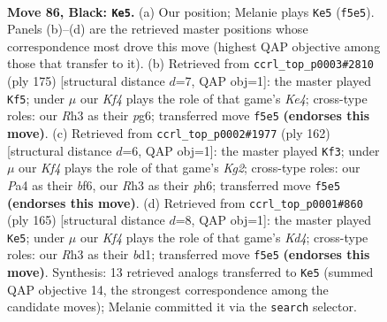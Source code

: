 \documentclass[11pt]{article}
\begin{document}
\clearpage

\begin{figure}[p]\centering
\begin{subfigure}{0.46\textwidth}\centering
\resizebox{\linewidth}{!}{%
\newchessgame
\chessboard[
  setfen={8/8/8/2p2k2/p2p4/7r/4K3/8 b - - 13 86},
  showmover=false,
  pgfstyle=straightmove, color=movearrow, markmove={f5-e5}
]}
\caption{}
\end{subfigure}\hfill
\begin{subfigure}{0.46\textwidth}\centering
\resizebox{\linewidth}{!}{%
\newchessgame
\chessboard[
  setfen={8/6p1/6Pp/4k3/1P5K/8/8/8 b - - 8 88},
  showmover=false,
  pgfstyle=straightmove, color=movearrow, markmove={e5-f5}
]}
\caption{}
\end{subfigure}
\\[4pt]
\begin{subfigure}{0.46\textwidth}\centering
\resizebox{\linewidth}{!}{%
\newchessgame
\chessboard[
  setfen={5k2/8/5b1p/5P2/6P1/8/6K1/8 w - - 4 82},
  showmover=false,
  pgfstyle=straightmove, color=movearrow, markmove={g2-f3}
]}
\caption{}
\end{subfigure}\hfill
\begin{subfigure}{0.46\textwidth}\centering
\resizebox{\linewidth}{!}{%
\newchessgame
\chessboard[
  setfen={8/8/8/3k2p1/7p/3K3P/8/3B4 b - - 26 83},
  showmover=false,
  pgfstyle=straightmove, color=movearrow, markmove={d5-e5}
]}
\caption{}
\end{subfigure}
\caption{\textbf{Move 86, Black: \texttt{Ke5}.} (a) Our position; Melanie plays \texttt{Ke5} (\texttt{f5e5}). Panels (b)--(d) are the retrieved master positions whose correspondence most drove this move (highest QAP objective among those that transfer to it). (b) Retrieved from \texttt{ccrl\_top\_p0003\#2810} (ply 175) [structural distance $d$=7, QAP obj=1]: the master played \texttt{Kf5}; under $\mu$ our \emph{Kf4} plays the role of that game's \emph{Ke4}; cross-type roles: our \emph{R}h3 as their \emph{p}g6; transferred move \texttt{f5e5} \textbf{(endorses this move)}. (c) Retrieved from \texttt{ccrl\_top\_p0002\#1977} (ply 162) [structural distance $d$=6, QAP obj=1]: the master played \texttt{Kf3}; under $\mu$ our \emph{Kf4} plays the role of that game's \emph{Kg2}; cross-type roles: our \emph{P}a4 as their \emph{b}f6, our \emph{R}h3 as their \emph{p}h6; transferred move \texttt{f5e5} \textbf{(endorses this move)}. (d) Retrieved from \texttt{ccrl\_top\_p0001\#860} (ply 165) [structural distance $d$=8, QAP obj=1]: the master played \texttt{Ke5}; under $\mu$ our \emph{Kf4} plays the role of that game's \emph{Kd4}; cross-type roles: our \emph{R}h3 as their \emph{b}d1; transferred move \texttt{f5e5} \textbf{(endorses this move)}. Synthesis: 13 retrieved analogs transferred to \texttt{Ke5} (summed QAP objective 14, the strongest correspondence among the candidate moves); Melanie committed it via the \texttt{search} selector.}
\label{fig:thought-m171}
\end{figure}
\end{document}

